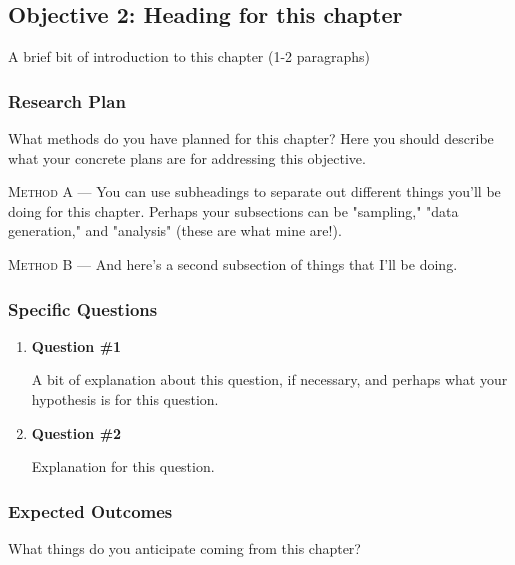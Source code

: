 \subsection{Objective 2: Heading for this chapter}
\label{objective2}
A brief bit of introduction to this chapter (1-2 paragraphs)

\subsubsection{Research Plan}
 What methods do you have planned for this chapter? Here you should describe what your concrete plans are for addressing this objective.
 
 \textsc{Method A ---} You can use subheadings to separate out different things you'll be doing for this chapter. Perhaps your subsections can be "sampling," "data generation," and "analysis" (these are what mine are!).
 
 \textsc{Method B ---} And here's a second subsection of things that I'll be doing.
 
\subsubsection{Specific Questions}
\begin{enumerate}
    \item \textbf{Question \#1}
    
    A bit of explanation about this question, if necessary, and perhaps what your hypothesis is for this question.
    
    \item \textbf{Question \#2}
    
    Explanation for this question.
    
\end{enumerate}

\subsubsection{Expected Outcomes}
What things do you anticipate coming from this chapter?